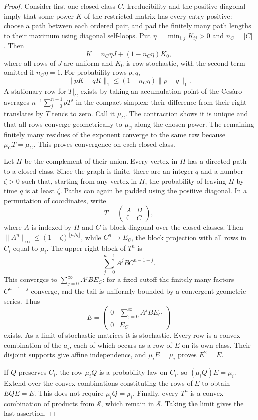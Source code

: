 \begin{proof}
Consider first one closed class $C$. Irreducibility and the positive
diagonal imply that some power $K$ of the restricted matrix has every
entry positive: choose a path between each ordered pair, and pad the
finitely many path lengths to their maximum using diagonal self-loops.
Put $\eta=\min_{i,j}K_{ij}>0$ and $n_C=|C|$. Then
\[
 K=n_C\eta J+(1-n_C\eta)K_0,
\]
where all rows of $J$ are uniform and $K_0$ is row-stochastic, with the
second term omitted if $n_C\eta=1$. For probability rows $p,q$,
\[
 \|pK-qK\|_1\le(1-n_C\eta)\|p-q\|_1.
\]
A stationary row for $T|_C$ exists by taking an accumulation point of the
Ces\`aro averages $n^{-1}\sum_{j=0}^{n-1}pT^j$ in the compact simplex:
their difference from their right translates by $T$ tends to zero.
Call it $\mu_C$. The contraction shows it is unique and that all rows
converge geometrically to $\mu_C$ along the chosen power. The remaining
finitely many residues of the exponent converge to the same row because
$\mu_CT=\mu_C$. This proves convergence on each closed class.

Let $H$ be the complement of their union. Every vertex in $H$ has a
directed path to a closed class. Since the graph is finite, there are
an integer $q$ and a number $\zeta>0$ such that, starting from any vertex
in $H$, the probability of leaving $H$ by time $q$ is at least $\zeta$.
Paths can again be padded using the positive diagonal. In a permutation
of coordinates, write
\[
 T=\begin{pmatrix}A&B\\0&C\end{pmatrix},
\]
where $A$ is indexed by $H$ and $C$ is block diagonal over the closed
classes. Then $\|A^n\|_\infty\le(1-\zeta)^{\lfloor n/q\rfloor}$, while
$C^n\to E_C$, the block projection with all rows in $C_i$ equal to
$\mu_i$. The upper-right block of $T^n$ is
\[
 \sum_{j=0}^{n-1}A^jBC^{n-1-j}.
\]
This converges to $\sum_{j=0}^\infty A^jBE_C$: for a fixed cutoff the
finitely many factors $C^{n-1-j}$ converge, and the tail is uniformly
bounded by a convergent geometric series. Thus
\[
 E=\begin{pmatrix}0&\sum_{j=0}^\infty A^jBE_C\\0&E_C\end{pmatrix}
\]
exists. As a limit of stochastic matrices it is stochastic. Every row
is a convex combination of the $\mu_i$, each of which occurs as a row
of $E$ on its own class. Their disjoint supports give affine independence,
and $\mu_iE=\mu_i$ proves $E^2=E$.

If $Q$ preserves $C_i$, the row $\mu_iQ$ is a probability law on $C_i$,
so $(\mu_iQ)E=\mu_i$. Extend over the convex combinations constituting
the rows of $E$ to obtain $EQE=E$. This does not require $\mu_iQ=\mu_i$.
Finally, every $T^n$ is a convex combination of products from
$\mathcal S$, which remain in $\mathcal S$. Taking the limit gives
the last assertion.
\end{proof}

